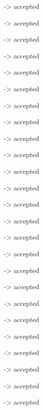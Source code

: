 -> accepted

-> accepted

-> accepted

-> accepted

-> accepted

-> accepted

-> accepted

-> accepted

-> accepted

-> accepted

-> accepted

-> accepted

-> accepted

-> accepted

-> accepted

-> accepted

-> accepted

-> accepted

-> accepted

-> accepted

-> accepted

-> accepted

-> accepted

-> accepted

-> accepted


